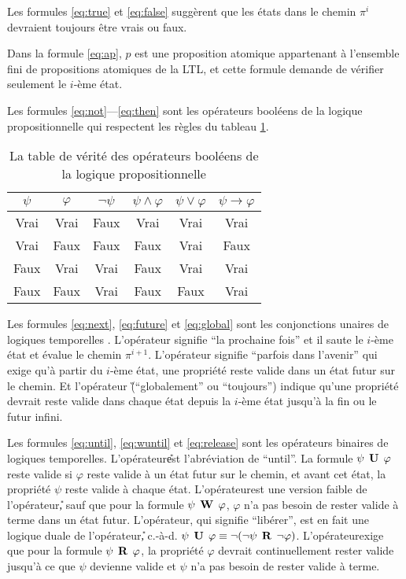 Les formules \ref{eq:true} et \ref{eq:false} suggèrent que les états dans le chemin $\pi^i$ devraient toujours être vrais ou faux.

Dans la formule \ref{eq:ap}, $p$ est une proposition atomique appartenant à l'ensemble fini de propositions atomiques de la LTL, et cette formule demande de vérifier seulement le $i$-ème état.

Les formules \ref{eq:not}---\ref{eq:then} sont les opérateurs booléens de la logique propositionnelle qui respectent les règles du tableau \ref{table:prologic}.

\begin{table}[h]
\centering
\begin{tabular}{|c|c|c|c|c|c|}
\hline
$\psi$ & $\varphi$ & $\neg\psi$ & $\psi \wedge \varphi$ & $\psi \vee \varphi$ & $\psi \rightarrow \varphi$ \\
\hline
Vrai & Vrai & Faux & Vrai & Vrai & Vrai \\
\hline
Vrai & Faux & Faux & Faux & Vrai & Faux \\
\hline
Faux & Vrai & Vrai & Faux & Vrai & Vrai \\
\hline
Faux & Faux & Vrai & Faux & Faux & Vrai \\
\hline
\end{tabular}
\caption{La table de vérité des opérateurs booléens de la logique propositionnelle}
\label{table:prologic}
\end{table}

Les formules \ref{eq:next}, \ref{eq:future} et \ref{eq:global} sont les conjonctions unaires de logiques temporelles . L'opérateur \X signifie ``la prochaine fois'' et il saute le $i$-ème état et évalue le chemin $\pi^{i + 1}$. L'opérateur \F signifie ``parfois dans l'avenir'' qui exige qu'à partir du $i$-ème état, une propriété reste valide dans un état futur sur le chemin. Et l'opérateur \G (``globalement'' ou ``toujours'') indique qu'une propriété devrait reste valide dans chaque état depuis la $i$-ème état jusqu'à la fin ou le futur infini.

Les formules \ref{eq:until}, \ref{eq:wuntil} et \ref{eq:release} sont les opérateurs binaires de logiques temporelles. L'opérateur\U est l'abréviation de ``until''. La formule $\psi \mathrel{\mbox{\,\textbf{U}}}\, \varphi$ reste valide si $\varphi$ reste valide à un état futur sur le chemin, et avant cet état, la propriété $\psi$ reste valide à chaque état. L'opérateur\W est une version faible de l'opérateur\U, sauf que pour la formule $\psi \mathrel{\mbox{\,\textbf{W}}}\, \varphi$, $\varphi$ n'a pas besoin de rester valide à terme dans un état futur. L'opérateur\R, qui signifie ``libérer'', est en fait une logique duale de l'opérateur\U, c.-à-d. $\psi \mathrel{\mbox{\,\textbf{U}}}\, \varphi \equiv \neg (\neg \psi \mathrel{\mbox{\,\textbf{R}}}\, \neg \varphi)$. L'opérateur\R exige que pour la formule $\psi \mathrel{\mbox{\,\textbf{R}}}\, \varphi$, la propriété $\varphi$ devrait continuellement rester valide jusqu'à ce que $\psi$ devienne valide et $\psi$ n'a pas besoin de rester valide à terme.

